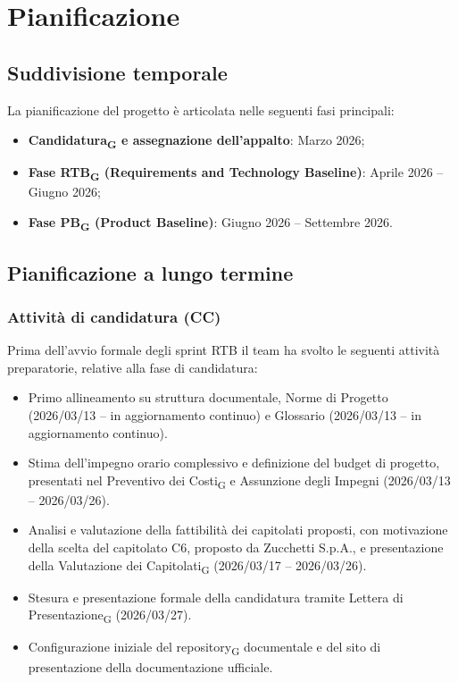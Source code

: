 \section{Pianificazione}

\subsection{Suddivisione temporale}

La pianificazione del progetto è articolata nelle seguenti fasi principali:
\begin{itemize}
\item \textbf{Candidatura\textsubscript{G} e assegnazione dell'appalto}: Marzo 2026;
\item \textbf{Fase RTB\textsubscript{G} (Requirements and Technology Baseline)}: Aprile 2026 -- Giugno 2026;
\item \textbf{Fase PB\textsubscript{G} (Product Baseline)}: Giugno 2026 -- Settembre 2026.
\end{itemize}

\subsection{Pianificazione a lungo termine}

\subsubsection{Attività di candidatura (CC)}

Prima dell'avvio formale degli sprint RTB il team ha svolto le seguenti attività
preparatorie, relative alla fase di candidatura:
\begin{itemize}
\item Primo allineamento su struttura documentale, Norme di Progetto
(2026/03/13 -- in aggiornamento continuo) e Glossario (2026/03/13 -- in aggiornamento continuo).
\item Stima dell'impegno orario complessivo e definizione del budget di progetto,
presentati nel Preventivo dei Costi\textsubscript{G} e Assunzione degli
Impegni (2026/03/13 -- 2026/03/26).
\item Analisi e valutazione della fattibilità dei capitolati proposti, con
motivazione della scelta del capitolato C6, proposto da Zucchetti S.p.A.,
e presentazione della Valutazione dei Capitolati\textsubscript{G}
(2026/03/17 -- 2026/03/26).
\item Stesura e presentazione formale della candidatura tramite Lettera di
Presentazione\textsubscript{G} (2026/03/27).
\item Configurazione iniziale del repository\textsubscript{G} documentale e del
sito di presentazione della documentazione ufficiale.
\end{itemize}

